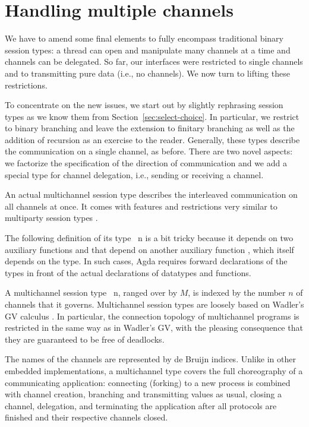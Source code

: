 \documentclass[acmsmall,review,anonymous,screen]{acmart}
\begin{document}
\section{Handling multiple channels}
\label{sec:handl-mult-chann}


We have to amend some final elements to fully encompass traditional binary
session types: a thread can open and manipulate many channels at a
time and channels can be delegated. So far, our interfaces were
restricted to single channels and to transmitting pure data (i.e., no channels). We
now turn to lifting these restrictions.

To concentrate on the new issues, 
we start out by slightly rephrasing session types as we
know them from Section~\ref{sec:select-choice}. In particular, we
restrict to binary branching and leave the extension
to finitary branching as well as the addition of recursion as an
exercise to the reader. Generally, these types describe 
the communication on a single channel, as before. There are two novel
aspects: we factorize the specification of the direction of
communication and we add a special type for channel delegation, i.e.,
sending or receiving a channel.

\multiSession

An actual multichannel session type describes the interleaved
communication on all channels at once. It comes with features and
restrictions very similar to multiparty session types
\cite{DBLP:journals/jacm/HondaYC16}.

The following definition of its type  {\AMSession~n} is a bit tricky
because it depends on two auxiliary functions {\ACausality} and
{\ACheckDual} that depend on another auxiliary function {\Aproject},
which itself depends on the {\AMSession} type. In such cases, Agda
requires forward declarations of the types in front of the actual
declarations of datatypes and functions. 

\multiMSesson

A multichannel session type {\AMSession~n}, ranged over by $M$, is indexed by the number $n$ of
channels that it governs. Multichannel session types are loosely based on Wadler's GV
calculus \cite{DBLP:journals/jfp/Wadler14}. In particular, the
connection topology of multichannel programs is restricted in the same
way as in Wadler's GV, with the pleasing
consequence that they are guaranteed to be free of deadlocks.

The names of the channels are represented by
de Bruijn indices. Unlike in other embedded implementations, a
multichannel type covers the full choreography of a communicating
application: connecting (forking) to a new process is combined with channel creation, branching and transmitting values as usual, closing a
channel, delegation, and terminating the application after all
protocols are finished and their respective channels closed.
\end{document}
